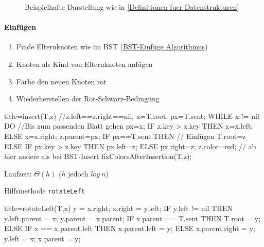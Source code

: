 \documentclass[
    ngerman,
    color=3b,
    dark_mode,
    load_common, %
    summary,
    boxarc,
]{tuda_summary}
\begin{document}
\begin{figure}[ht]
    \centering
    \caption{Beispielhafte Darstellung wie in \ref{Definitionen fuer Datenstrukturen}}
    \label{fig:red_black_tree_example}
\end{figure}
\clearpage
\paragraph{Einfügen}
\begin{enumerate}
    \item Finde Elternknoten wie im BST (\hyperref[BST-Insert]{BST-Einfüge Algorithmus})
    \item Knoten als Kind von Elternknoten anfügen
    \item Färbe den neuen Knoten rot
    \item Wiederherstellen der Rot-Schwarz-Bedingung
\end{enumerate}
\begin{codeBlock}[autogobble,escapeinside=||]{title={insert(T,z) //z.left==z.right==nil;}}
    x=T.root; px=T.sent;
    WHILE x != nil DO                   //Bis zum passenden Blatt gehen
        px=x;
        IF x.key > z.key THEN
            x=x.left;
        ELSE
            x=x.right;
    z.parent=px;
    IF px==T.sent THEN                  // Einfügen
        T.root=z
    ELSE
        IF px.key > z.key THEN
            px.left=z;
        ELSE
            px.right=z;
    z.color=red;                        // ab hier anders als bei BST-Insert
    fixColorsAfterInsertion(T,z);
\end{codeBlock} 
Laufzeit: $\Theta(h)$ ($h$ jedoch $log~n$)

Hilfsmethode \texttt{rotateLeft}
\begin{codeBlock}[autogobble]{title={rotateLeft(T,x)}}
    y = x.right;
    x.right = y.left;
    IF y.left != nil THEN
        y.left.parent = x;
    y.parent = x.parent;
    IF x.parent == T.sent THEN
        T.root = y;
    ELSE
        IF x == x.parent.left THEN
            x.parent.left = y;
        ELSE
            x.parent.right = y;
    y.left = x;
    x.parent = y;
\end{codeBlock}
\clearpage
\end{document}
